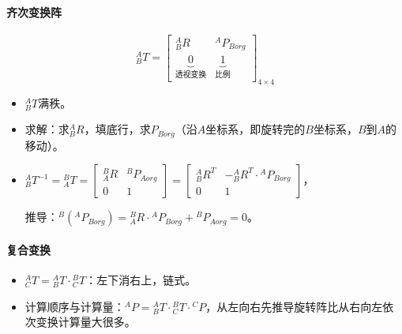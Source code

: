 \documentclass[
12pt, %
a4paper, 
oneside, %
headinclude,footinclude, %
]{scrartcl}
\begin{document}
\paragraph{齐次变换阵}
$$ {}^A_B T = \begin{bmatrix} {}^A_B R & {}^A P_{Borg} \\ \underbrace{0}_{\text{透视变换}} & \underbrace{1}_{\text{比例}} \end{bmatrix}_{4 \times 4} $$
\begin{itemize}
\item $ {}^A_B T $满秩。
\item 求解：求$ {}^A_B R $，填底行，求$ P_{Borg} $（沿$ A $坐标系，即旋转完的$ B $坐标系，$ B $到$ A $的移动）。
\item 
$ 
{}^A_B T^{-1} = {}^B_A T 
= \begin{bmatrix} {}^B_A R & {}^B P_{Aorg} \\ 0 & 1 \end{bmatrix} 
= \begin{bmatrix} {}^A_B R^T & -{}^A_B R^T \cdot {}^A P_{Borg} \\ 0 & 1 \end{bmatrix} 
$，

推导：$ {}^B({}^A P_{Borg}) = {}^B_A R \cdot {}^A P_{Borg} + {}^B P_{Aorg} = 0 $。
\end{itemize}
\paragraph{复合变换}
\begin{itemize}
\item $ {}^A_C T = {}^A_B T \cdot {}^B_C T $：左下消右上，链式。
\item 计算顺序与计算量：$ {}^A P = {}^A_B T \cdot {}^B_C T \cdot {}^C P $，从左向右先推导旋转阵比从右向左依次变换计算量大很多。
\end{itemize}
\end{document}
